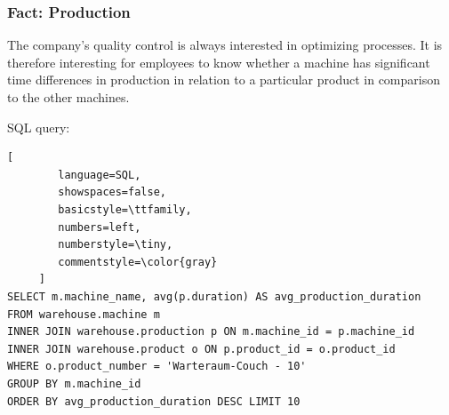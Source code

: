 \documentclass[letterpaper,12pt]{article}
\begin{document}
\subsubsection{Fact: Production}

The company's quality control is always interested in optimizing processes. It is therefore interesting for employees to know whether a machine has significant time differences in production in relation to a particular product in comparison to the other machines.

\bigskip
\noindent SQL query:
\begin{lstlisting}[
        language=SQL,
        showspaces=false,
        basicstyle=\ttfamily,
        numbers=left,
        numberstyle=\tiny,
        commentstyle=\color{gray}
     ]
SELECT m.machine_name, avg(p.duration) AS avg_production_duration
FROM warehouse.machine m
INNER JOIN warehouse.production p ON m.machine_id = p.machine_id
INNER JOIN warehouse.product o ON p.product_id = o.product_id
WHERE o.product_number = 'Warteraum-Couch - 10'
GROUP BY m.machine_id
ORDER BY avg_production_duration DESC LIMIT 10
\end{lstlisting}
\end{document}
